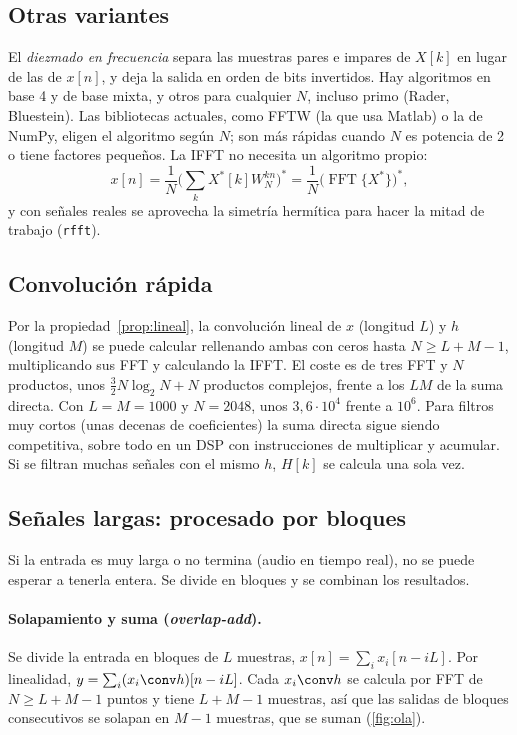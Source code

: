 \documentclass[11pt,a4paper]{scrartcl}
\begin{document}
\subsection{Otras variantes}

El \emph{diezmado en frecuencia} separa las muestras pares e impares de $X[k]$ en lugar de las de $x[n]$, y deja la salida en orden de bits invertidos. Hay algoritmos en base 4 y de base mixta, y otros para cualquier $N$, incluso primo (Rader, Bluestein). Las bibliotecas actuales, como FFTW (la que usa Matlab) o la de NumPy, eligen el algoritmo según $N$; son más rápidas cuando $N$ es potencia de 2 o tiene factores pequeños. La IFFT no necesita un algoritmo propio:
\[
  x[n]=\frac1N\Big(\sum_kX^*[k]W_N^{kn}\Big)^*=\frac1N\big(\operatorname{FFT}\{X^*\}\big)^*,
\]
y con señales reales se aprovecha la simetría hermítica para hacer la mitad de trabajo (\texttt{rfft}).

\subsection{Convolución rápida}

Por la propiedad~\ref{prop:lineal}, la convolución lineal de $x$ (longitud $L$) y $h$ (longitud $M$) se puede calcular rellenando ambas con ceros hasta $N\ge L+M-1$, multiplicando sus FFT y calculando la IFFT. El coste es de tres FFT y $N$ productos, unos $\frac32N\log_2N+N$ productos complejos, frente a los $LM$ de la suma directa. Con $L=M=1000$ y $N=2048$, unos $3{,}6\cdot10^4$ frente a $10^6$. Para filtros muy cortos (unas decenas de coeficientes) la suma directa sigue siendo competitiva, sobre todo en un DSP con instrucciones de multiplicar y acumular. Si se filtran muchas señales con el mismo $h$, $H[k]$ se calcula una sola vez.

\subsection{Señales largas: procesado por bloques}\label{sec:bloques}

Si la entrada es muy larga o no termina (audio en tiempo real), no se puede esperar a tenerla entera. Se divide en bloques y se combinan los resultados.

\paragraph{Solapamiento y suma (\emph{overlap-add}).} Se divide la entrada en bloques de $L$ muestras, $x[n]=\sum_ix_i[n-iL]$. Por linealidad, $y=\sum_i(x_i\conv h)[n-iL]$. Cada $x_i\conv h$ se calcula por FFT de $N\ge L+M-1$ puntos y tiene $L+M-1$ muestras, así que las salidas de bloques consecutivos se solapan en $M-1$ muestras, que se suman (\cref{fig:ola}).
\end{document}
